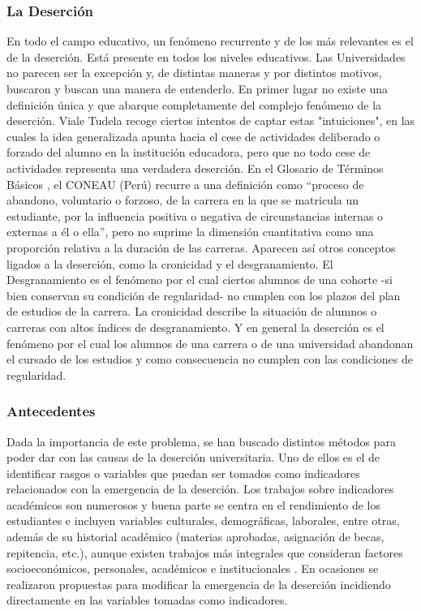 \subsubsection{La Deserción}
En todo el campo educativo, un fenómeno recurrente y de los más relevantes es el de la deserción. Está presente en todos los niveles educativos. Las Universidades no parecen ser la excepción y, de distintas maneras y por distintos motivos, buscaron y buscan una manera de entenderlo. En primer lugar no existe una definición única y que abarque completamente del complejo fenómeno de la deserción.  
Viale Tudela \cite{ErnestoUNAOUT} recoge ciertos intentos de captar estas "intuiciones", en las cuales la idea generalizada apunta hacia el cese de actividades deliberado o forzado del alumno en la institución educadora, pero que no todo cese de actividades representa una
verdadera deserción. En el Glosario de Términos Básicos \cite{CONEAU2010PropuestaSINEACE}, el CONEAU (Perú) recurre a una definición como “proceso de abandono, voluntario o forzoso, de la carrera en la que se matricula un estudiante, por la influencia positiva o negativa de circunstancias internas o externas a él o ella”, pero no suprime la dimensión cuantitativa como una proporción relativa a la duración de las carreras. Aparecen así otros conceptos ligados a la deserción, como la cronicidad y el desgranamiento. El Desgranamiento es el fenómeno por el cual ciertos alumnos de una cohorte -si bien conservan su condición de regularidad- no cumplen con los plazos del plan de estudios de la carrera. La cronicidad describe la situación de alumnos o carreras con altos índices de desgranamiento. Y en general la deserción es el fenómeno por el cual los alumnos de una carrera o de una universidad abandonan el cursado de los estudios y como consecuencia no cumplen con las  condiciones de regularidad.

\subsubsection{Antecedentes}
Dada la importancia de este problema, se han buscado distintos métodos para poder dar con  las causas de la deserción universitaria. Uno de ellos es el de identificar rasgos o variables que puedan ser tomados como indicadores relacionados con la emergencia de la deserción. Los trabajos sobre indicadores académicos son numerosos y buena parte se centra en el rendimiento de los estudiantes e incluyen variables culturales, demográficas, laborales, entre otras, además de su historial académico (materias aprobadas, asignación de becas, repitencia, etc.), aunque existen trabajos más integrales que consideran factores socioeconómicos, personales, académicos e institucionales \cite{L.GonzalezFeigehen2006RepitenciaLatina,SociedadModeloSuperior}.
En ocasiones se realizaron propuestas \cite{Kuna2009IdentificacionUniversitarios} para modificar la emergencia de la deserción incidiendo directamente en las variables tomadas como indicadores.




